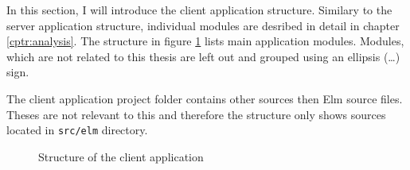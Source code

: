 In this section, I will introduce the client application structure.
Similary to the server application structure, individual modules are desribed in detail in chapter \ref{cptr:analysis}.
The structure in figure \ref{fig:client-structure} lists main application modules.
Modules, which are not related to this thesis are left out and grouped using an ellipsis (\dots) sign.

The client application project folder contains other sources then Elm source files.
Theses are not relevant to this and therefore the structure only shows sources located in \texttt{src/elm} directory.

\begin{figure}[H]
    \caption{Structure of the client application}\label{fig:client-structure}
\end{figure}
